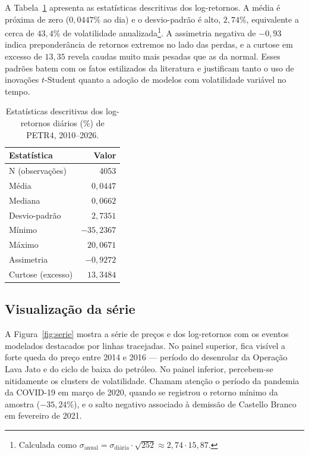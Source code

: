 \documentclass[12pt, a4paper]{article}
\begin{document}
A Tabela~\ref{tab:descritivas} apresenta as estatísticas descritivas dos log-retornos. A média é próxima de zero ($0{,}0447\%$ ao dia) e o desvio-padrão é alto, $2{,}74\%$, equivalente a cerca de $43{,}4\%$ de volatilidade anualizada\footnote{Calculada como $\sigma_{\text{anual}} = \sigma_{\text{diária}} \cdot \sqrt{252} \approx 2{,}74 \cdot 15{,}87$.}. A assimetria negativa de $-0{,}93$ indica preponderância de retornos extremos no lado das perdas, e a curtose em excesso de $13{,}35$ revela caudas muito mais pesadas que as da normal. Esses padrões batem com os fatos estilizados da literatura \cite{morettin2017} e justificam tanto o uso de inovações $t$-Student quanto a adoção de modelos com volatilidade variável no tempo.

\begin{table}[H]
\centering
\caption{Estatísticas descritivas dos log-retornos diários (\%) de PETR4, 2010--2026.}
\label{tab:descritivas}
\begin{tabular}{lr}
\toprule
Estatística & Valor \\
\midrule
N (observações)    & 4053 \\
Média              & $0{,}0447$ \\
Mediana            & $0{,}0662$ \\
Desvio-padrão      & $2{,}7351$ \\
Mínimo             & $-35{,}2367$ \\
Máximo             & $20{,}0671$ \\
Assimetria         & $-0{,}9272$ \\
Curtose (excesso)  & $13{,}3484$ \\
\bottomrule
\end{tabular}
\end{table}

\subsection{Visualização da série}

A Figura~\ref{fig:serie} mostra a série de preços e dos log-retornos com os eventos modelados destacados por linhas tracejadas. No painel superior, fica visível a forte queda do preço entre 2014 e 2016 --- período do desenrolar da Operação Lava Jato e do ciclo de baixa do petróleo. No painel inferior, percebem-se nitidamente os clusters de volatilidade. Chamam atenção o período da pandemia da COVID-19 em março de 2020, quando se registrou o retorno mínimo da amostra ($-35{,}24\%$), e o salto negativo associado à demissão de Castello Branco em fevereiro de 2021.
\end{document}

